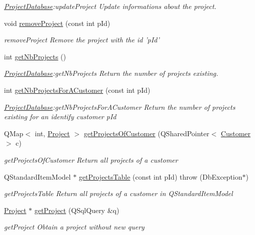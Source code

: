 \begin{DoxyCompactItemize}
\begin{DoxyCompactList}\small\item\em \hyperlink{classProjectDatabase}{Project\+Database}\+:update\+Project Update informations about the project. \end{DoxyCompactList}\item 
void \hyperlink{classProjectDatabase_a52f3c3b312c418568531eb4cd2ecf615}{remove\+Project} (const int p\+Id)
\begin{DoxyCompactList}\small\item\em remove\+Project Remove the project with the id 'p\+Id' \end{DoxyCompactList}\item 
int \hyperlink{classProjectDatabase_a48ab28fa18bc3f0371f8c17c5421a46e}{get\+Nb\+Projects} ()
\begin{DoxyCompactList}\small\item\em \hyperlink{classProjectDatabase}{Project\+Database}\+:get\+Nb\+Projects Return the number of projects existing. \end{DoxyCompactList}\item 
int \hyperlink{classProjectDatabase_a3dbf2e270674727fc479d392c6609dec}{get\+Nb\+Projects\+For\+A\+Customer} (const int p\+Id)
\begin{DoxyCompactList}\small\item\em \hyperlink{classProjectDatabase}{Project\+Database}\+:get\+Nb\+Projects\+For\+A\+Customer Return the number of projects existing for an identify customer {\itshape p\+Id} \end{DoxyCompactList}\item 
Q\+Map$<$ int, \hyperlink{classProject}{Project} $>$ \hyperlink{classProjectDatabase_a674675237e10929f6096e271a93692ee}{get\+Projects\+Of\+Customer} (Q\+Shared\+Pointer$<$ \hyperlink{classCustomer}{Customer} $>$ c)
\begin{DoxyCompactList}\small\item\em get\+Projects\+Of\+Customer Return all projects of a customer \end{DoxyCompactList}\item 
Q\+Standard\+Item\+Model $\ast$ \hyperlink{classProjectDatabase_af757914e88f67d9b62e4e762f8136048}{get\+Projects\+Table} (const int p\+Id)  throw (\+Db\+Exception$\ast$)
\begin{DoxyCompactList}\small\item\em get\+Projects\+Table Return all projects of a customer in Q\+Standard\+Item\+Model \end{DoxyCompactList}\item 
\hyperlink{classProject}{Project} $\ast$ \hyperlink{classProjectDatabase_a3d4d47a7c391eaf1e959d5ac13ef574f}{get\+Project} (Q\+Sql\+Query \&q)
\begin{DoxyCompactList}\small\item\em get\+Project Obtain a project without new query \end{DoxyCompactList}\end{DoxyCompactItemize}
